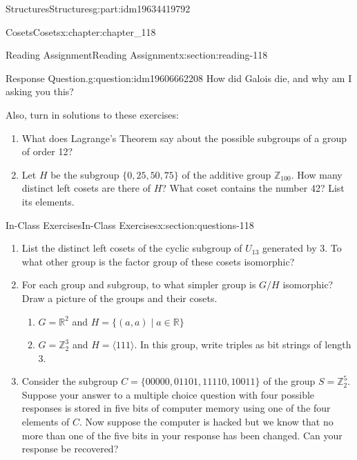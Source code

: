 \documentclass[oneside,10pt,]{book}
\numberwithin{equation}{section}
\begin{document}
\begin{partptx}{Structures}{}{Structures}{}{}{g:part:idm19634419792}
\begin{chapterptx}{Cosets}{}{Cosets}{}{}{x:chapter:chapter_118}
\begin{sectionptx}{Reading Assignment}{}{Reading Assignment}{}{}{x:section:reading-118}
\begin{question}{Response Question.}{g:question:idm19606662208}%
How did Galois die, and why am I asking you this?%
\end{question}
Also, turn in solutions to these exercises:%
\begin{enumerate}[label=\arabic*.]
\item{}What does Lagrange's Theorem say about the possible subgroups of a group of order 12?%
\item{}Let \(H\) be the subgroup \(\{0,25,50,75\}\) of the additive group \(\mathbb{Z}_{100}\). How many distinct left cosets are there of \(H\)?  What coset contains the number 42? List its elements.%
\end{enumerate}
%
\end{sectionptx}
%
%
\typeout{************************************************}
\typeout{************************************************}
%
\begin{sectionptx}{In-Class Exercises}{}{In-Class Exercises}{}{}{x:section:questions-118}
%
\begin{enumerate}[label=\arabic*.]
\item{}List the distinct left cosets of the cyclic subgroup of \(U_{13}\) generated by 3. To what other group is the factor group of these cosets isomorphic?%
\item{}For each group and subgroup, to what simpler group is  \(G/H\) isomorphic?  Draw a picture of the groups and their cosets.%
\begin{enumerate}[label=(\alph*)]
\item{}\(G= \mathbb{R}^2\)  and  \(H = \{(a,a) \mid a\in\mathbb{R}\}\)%
\item{}\(G = \mathbb{Z}_2^3\)  and  \(H = \langle 111 \rangle\).  In this group, write triples as bit strings of length 3.%
\end{enumerate}
%
\item{}Consider the subgroup \(C = \{00000, 01101, 11110, 10011\}\) of the group \(S=\mathbb{Z}_2^5\). Suppose your answer to a multiple choice question with four possible responses is stored in five bits of computer memory using one of the four elements of  \(C\).  Now suppose the computer is hacked but we know that no more than one of the five bits in your response has been changed.  Can your response be recovered?%
\end{enumerate}
%
\end{sectionptx}
\end{chapterptx}

\end{partptx}
\end{document}
